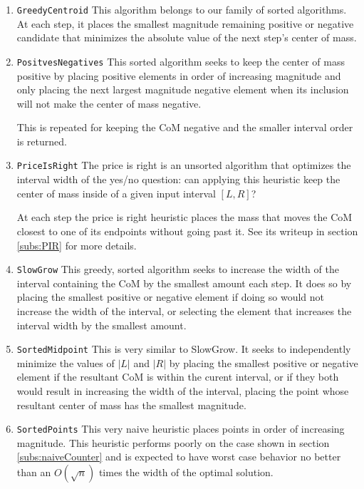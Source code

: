 \begin{enumerate}
\item \texttt{GreedyCentroid}
  This algorithm belongs to our family of sorted algorithms.  At each step, it places the smallest magnitude remaining positive or negative candidate that minimizes the absolute value of the next step's center of mass. 

\item \texttt{PositvesNegatives}
  This sorted algorithm seeks to keep the center of mass positive by placing positive elements in order of increasing magnitude and only placing the next largest magnitude negative element when its inclusion will not make the center of mass negative.

This is repeated for keeping the CoM negative and the smaller interval order is returned.

\item \texttt{PriceIsRight}
The price is right is an unsorted algorithm that optimizes the interval width of the yes/no question: can applying this heuristic keep the center of mass inside of a given input interval $[L,R]$?

At each step the price is right heuristic places the mass that moves the CoM closest to one of its endpoints without going past it.  See its writeup in section \ref{subs:PIR} for more details.

\item \texttt{SlowGrow}
This greedy, sorted algorithm seeks to increase the width of the interval containing the CoM by the smallest amount each step.  It does so by placing the smallest positive or negative element if doing so would not increase the width of the interval, or selecting the element that increases the interval width by the smallest amount. 

\item \texttt{SortedMidpoint}
This is very similar to SlowGrow.  It seeks to independently minimize the values of $|L|$ and $|R|$ by placing the smallest positive or negative element if the resultant CoM is within the curent interval, or if they both would result in increasing the width of the interval, placing the point whose resultant center of mass has the smallest magnitude.

\item \texttt{SortedPoints}
This very naive heuristic places points in order of increasing magnitude.  This heuristic performs poorly on the case shown in section \ref{subs:naiveCounter} and is expected to have worst case behavior no better than an $O(\sqrt{n})$ times the width of the optimal solution.


\end{enumerate}
